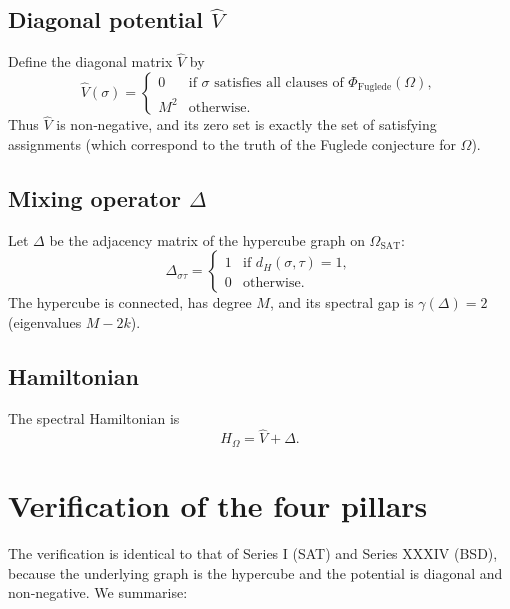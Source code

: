 \documentclass[11pt,a4paper]{article}
\begin{document}
\subsection{Diagonal potential $\hat{V}$}
Define the diagonal matrix $\hat{V}$ by
\[
\hat{V}(\sigma) = \begin{cases}
0 & \text{if } \sigma \text{ satisfies all clauses of } \Phi_{\text{Fuglede}}(\Omega),\\
M^2 & \text{otherwise}.
\end{cases}
\]
Thus $\hat{V}$ is non‑negative, and its zero set is exactly the set of satisfying assignments (which correspond to the truth of the Fuglede conjecture for $\Omega$).

\subsection{Mixing operator $\Delta$}
Let $\Delta$ be the adjacency matrix of the hypercube graph on $\Omega_{\text{SAT}}$:
\[
\Delta_{\sigma\tau} = \begin{cases}
1 & \text{if } d_H(\sigma,\tau)=1,\\
0 & \text{otherwise}.
\end{cases}
\]
The hypercube is connected, has degree $M$, and its spectral gap is $\gamma(\Delta)=2$ (eigenvalues $M-2k$).

\subsection{Hamiltonian}
The spectral Hamiltonian is
\[
H_\Omega = \hat{V} + \Delta.
\]

\section{Verification of the four pillars}

The verification is identical to that of Series I (SAT) and Series XXXIV (BSD), because the underlying graph is the hypercube and the potential is diagonal and non‑negative. We summarise:
\end{document}
